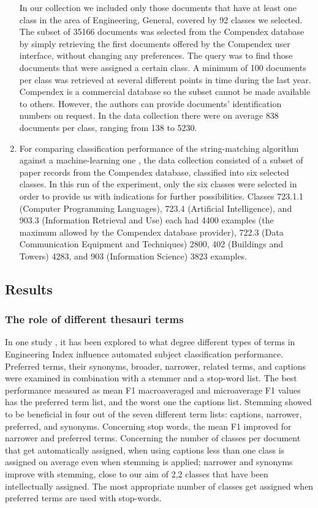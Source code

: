 \begin{enumerate}
In our collection we included only those documents that have at least one class in the area of Engineering, General, covered by 92 classes we selected. The subset of 35166 documents was selected from the Compendex database by simply retrieving the first documents offered by the Compendex user interface, without changing any preferences. The query was to find those documents that were assigned a certain class. A minimum of 100 documents per class was retrieved at several different points in time during the last year. Compendex is a commercial database so the subset cannot be made available to others. However, the authors can provide documents' identification numbers on request. In the data collection there were on average 838 documents per class, ranging from 138 to 5230.

\item For comparing classification performance of the string-matching algorithm against a machine-learning one \cite{ardo06:_ECDL}, the data collection consisted of a subset of paper records from the Compendex database, classified into six selected classes. In this run of the experiment, only the six classes were selected in order to provide us with indications for further possibilities. Classes 723.1.1 (Computer Programming Languages), 723.4 (Artificial Intelligence), and 903.3 (Information Retrieval and Use) each had 4400 examples (the maximum allowed by the Compendex database provider), 722.3 (Data Communication Equipment and Techniques) 2800, 402 (Buildings and Towers) 4283, and 903 (Information Science) 3823 examples.
\end{enumerate}

\subsection{Results}

\subsubsection{The role of different thesauri terms}
In one study \cite{GolubRole}, it has been explored to what degree different types of terms in Engineering Index influence automated subject classification performance. Preferred terms, their synonyms, broader, narrower, related terms, and captions were examined in combination with a stemmer and a stop-word list. The best performance measured as mean F1 macroaveraged and microaverage F1 values has the preferred term list, and the worst one the captions list. Stemming showed to be beneficial in four out of the seven different term lists: captions, narrower, preferred, and synonyms. Concerning stop words, the mean F1 improved for narrower and preferred terms. Concerning the number of classes per document that get automatically assigned, when using captions less than one class is assigned on average even when stemming is applied; narrower and synonyms improve with stemming, close to our aim of 2,2 classes that have been intellectually assigned. The most appropriate number of classes get assigned when preferred terms are used with stop-words. 

